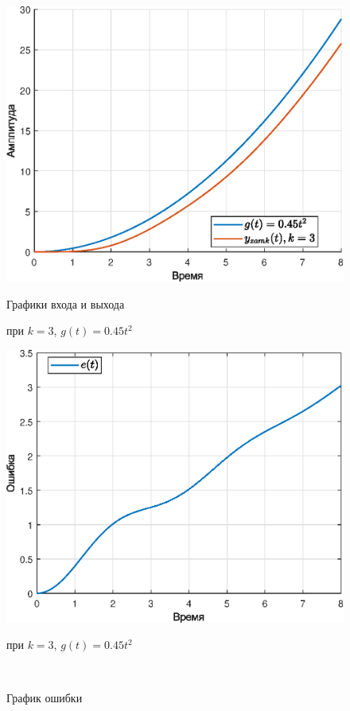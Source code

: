 \documentclass[a4paper]{article}
\begin{document}
\begin{figure}[H]
    \begin{minipage}{0.5\textwidth}
        \centering \includegraphics[width=\textwidth]{ex4/k3_g_at2.eps}
        \caption{Графики входа и выхода}
        \centerline{при $k=3$, $g(t)=0.45t^2$}
    \end{minipage}\hfill
    \begin{minipage}{0.5\textwidth}
        \centering \includegraphics[width=\textwidth]{ex4/k3_g_at2_error.eps}
        \caption{График ошибки}
        \centerline{при $k=3$, $g(t)=0.45t^2$}
    \end{minipage}\\[1em]
\end{figure}\noindent\
\end{document}
